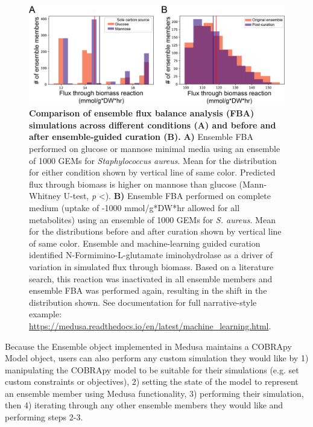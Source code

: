 \documentclass[11pt,twocolumn,notitlepage,openany,twoside]{book}
\begin{document}
\begin{refsection}
\begin{figure}[tb]
\centering
\includegraphics[width=\textwidth]{ch4_fig3}
\caption[ Comparison of ensemble flux balance analysis (FBA) simulations across different conditions (A) and before and after ensemble-guided curation (B).]{\textbf{ Comparison of ensemble flux balance analysis (FBA) simulations across different conditions (A) and before and after ensemble-guided curation (B).} \textbf{A)} Ensemble FBA performed on glucose or mannose minimal media using an ensemble of 1000 GEMs for \textit{Staphylococcus aureus}. Mean for the distribution for either condition shown by vertical line of same color. Predicted flux through biomass is higher on mannose than glucose (Mann-Whitney U-test, \textit{p} \textless{}). \textbf{B)} Ensemble FBA performed on complete medium (uptake of -1000 mmol/g*DW*hr allowed for all metabolites) using an ensemble of 1000 GEMs for \textit{S. aureus}. Mean for the distributions before and after curation shown by vertical line of same color. Ensemble and machine-learning guided curation identified N-Formimino-L-glutamate iminohydrolase as a driver of variation in simulated flux through biomass. Based on a literature search, this reaction was inactivated in all ensemble members and ensemble FBA was performed again, resulting in the shift in the distribution shown. See documentation for full narrative-style example: \url{https://medusa.readthedocs.io/en/latest/machine_learning.html}.}
\end{figure}


Because the Ensemble object implemented in Medusa maintains a COBRApy Model object, users can also perform any custom simulation they would like by 1) manipulating the COBRApy model to be suitable for their simulations (e.g. set custom constraints or objectives), 2) setting the state of the model to represent an ensemble member using Medusa functionality, 3) performing their simulation, then 4) iterating through any other ensemble members they would like and performing steps 2-3.


\end{refsection}
\end{document}
